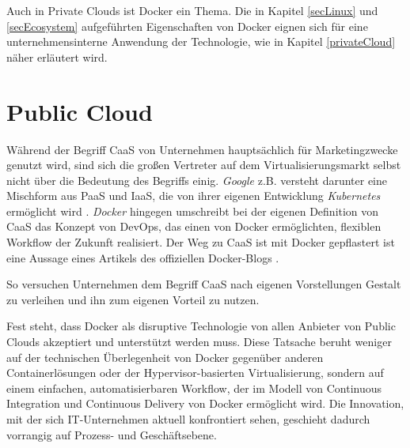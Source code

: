 \documentclass[../main.tex]{subfiles}
\begin{document}
  Auch in Private Clouds ist Docker ein Thema. Die in Kapitel \ref{secLinux} und \ref{secEcosystem} aufgeführten Eigenschaften von Docker eignen sich für eine unternehmensinterne Anwendung der Technologie, wie in Kapitel \ref{privateCloud} näher erläutert wird.




  \section{Public Cloud}
  \label{publicCloud}
    Während der Begriff CaaS von Unternehmen hauptsächlich für Marketingzwecke genutzt wird, sind sich die großen Vertreter auf dem Virtualisierungsmarkt selbst nicht über die Bedeutung des Begriffs einig. \emph{Google} z.B. versteht darunter eine Mischform aus PaaS und IaaS, die von ihrer eigenen Entwicklung \emph{Kubernetes} ermöglicht wird \cite[S.12]{http://www.slideshare.net/brendandburns/defrag-2014-41815642?ref=http://thenewstack.io/google-offers-container-as-a-service-to-define-kubernetes-place-in-the-cloud-economy/}.
    \emph{Docker} hingegen umschreibt bei der eigenen Definition von CaaS das Konzept von DevOps, das einen von Docker ermöglichten, flexiblen Workflow der Zukunft realisiert. \glqq{}Der Weg zu CaaS ist mit Docker gepflastert \grqq{} ist eine Aussage eines Artikels des offiziellen Docker-Blogs \cite{https://blog.docker.com/2016/02/containers-as-a-service-caas/}.

    So versuchen Unternehmen dem Begriff CaaS nach eigenen Vorstellungen Gestalt zu verleihen und ihn zum eigenen Vorteil zu nutzen.

    Fest steht, dass Docker als disruptive Technologie von allen Anbieter von Public Clouds akzeptiert und unterstützt werden muss. Diese Tatsache beruht weniger auf der technischen Überlegenheit von Docker gegenüber anderen Containerlösungen oder der Hypervisor-basierten Virtualisierung, sondern auf einem einfachen, automatisierbaren Workflow, der im Modell von Continuous Integration und Continuous Delivery von Docker ermöglicht wird. Die Innovation, mit der sich IT-Unternehmen aktuell konfrontiert sehen, geschieht dadurch vorrangig auf Prozess- und Geschäftsebene.
\end{document}
